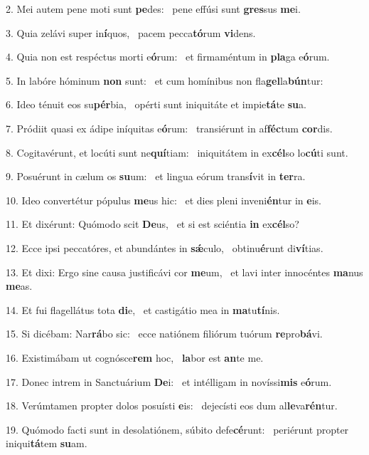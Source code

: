 2. Mei autem pene moti sunt \textbf{pe}des: \ast\  pene effúsi sunt \textbf{gres}sus \textbf{me}i.\

3. Quia zelávi super in\textbf{í}quos, \ast\  pacem pecca\textbf{tó}rum \textbf{vi}dens.\

4. Quia non est respéctus morti e\textbf{ó}rum: \ast\  et firmaméntum in \textbf{pla}ga e\textbf{ó}rum.\

5. In labóre hóminum \textbf{non} sunt: \ast\  et cum homínibus non fla\textbf{gel}la\textbf{bún}tur:\

6. Ideo ténuit eos su\textbf{pér}bia, \ast\  opérti sunt iniquitáte et impie\textbf{tá}te \textbf{su}a.\

7. Pródiit quasi ex ádipe iníquitas e\textbf{ó}rum: \ast\  transiérunt in af\textbf{féc}tum \textbf{cor}dis.\

8. Cogitavérunt, et locúti sunt ne\textbf{quí}tiam: \ast\  iniquitátem in ex\textbf{cél}so lo\textbf{cú}ti sunt.\

9. Posuérunt in cælum os \textbf{su}um: \ast\  et lingua eórum trans\textbf{í}vit in \textbf{ter}ra.\

10. Ideo convertétur pópulus \textbf{me}us hic: \ast\  et dies pleni inveni\textbf{én}tur in \textbf{e}is.\

11. Et dixérunt: Quómodo scit \textbf{De}us, \ast\  et si est sciéntia \textbf{in} ex\textbf{cél}so?\

12. Ecce ipsi peccatóres, et abundántes in \textbf{sǽ}culo, \ast\  obtinu\textbf{é}runt di\textbf{ví}tias.\

13. Et dixi: Ergo sine causa justificávi cor \textbf{me}um, \ast\  et lavi inter innocéntes \textbf{ma}nus \textbf{me}as.\

14. Et fui flagellátus tota \textbf{di}e, \ast\  et castigátio mea in \textbf{ma}tu\textbf{tí}nis.\

15. Si dicébam: Nar\textbf{rá}bo sic: \ast\  ecce natiónem filiórum tuórum \textbf{re}pro\textbf{bá}vi.\

16. Existimábam ut cognósce\textbf{rem} hoc, \ast\  \textbf{la}bor est \textbf{an}te me.\

17. Donec intrem in Sanctuárium \textbf{De}i: \ast\  et intélligam in novíssi\textbf{mis} e\textbf{ó}rum.\

18. Verúmtamen propter dolos posuísti \textbf{e}is: \ast\  dejecísti eos dum al\textbf{le}va\textbf{rén}tur.\

19. Quómodo facti sunt in desolatiónem, súbito defe\textbf{cé}runt: \ast\  periérunt propter iniqui\textbf{tá}tem \textbf{su}am.\

